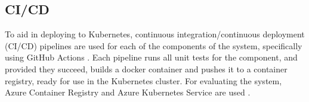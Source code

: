\subsection{CI/CD}
To aid in deploying to Kubernetes, continuous integration/continuous deployment (CI/CD) pipelines are used for each of the components of the system, specifically using GitHub Actions . Each pipeline runs all unit tests for the component, and provided they succeed, builds a docker container and pushes it to a container registry, ready for use in the Kubernetes cluster. For evaluating the system, Azure Container Registry and Azure Kubernetes Service are used .

